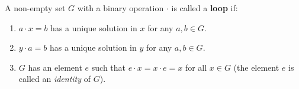 A non-empty set $G$ with a binary operation $\cdot$ is called a \textbf{loop} if:

\begin{enumerate}
\item[(i)] $a \cdot x = b$ has a unique solution in $x$ for any $a, b \in G$.
\item[(ii)] $y \cdot a = b$ has a unique solution in $y$ for any $a, b \in G$.
\item[(iii)] $G$ has an element $e$ such that $e \cdot x = x \cdot e = x$ for all $x \in G$ (the element $e$ is called an \textit{identity} of $G$).
\end{enumerate}
